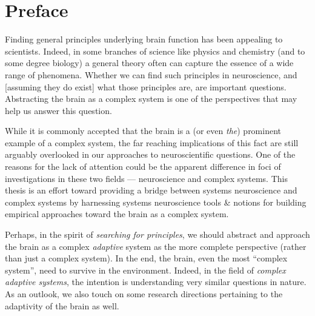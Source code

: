\begingroup
\let\clearpage\relax
\let\cleardoublepage\relax
\let\cleardoublepage\relax

\chapter*{Preface} %

Finding general principles underlying brain function has been appealing to scientists.
Indeed, in some branches of science like physics and chemistry (and to some degree biology) a general theory often can capture the essence of a wide range of phenomena.
Whether we can find such principles in neuroscience, and [assuming they do exist]
what those principles are, are important questions.
Abstracting the brain as a complex system is one of the perspectives that
may help us answer this question.

While it is commonly accepted that the brain is a (or even \emph{the}) prominent example of a complex system, 
the far reaching implications of this fact are still arguably overlooked in our approaches to neuroscientific questions.
% 
One of the reasons for the lack of attention could be the apparent difference in foci of investigations in these two fields --- neuroscience and complex systems.
This thesis is an effort toward providing a bridge between systems neuroscience and complex systems
by harnessing systems neuroscience tools \& notions for building empirical approaches toward the brain as a complex system.


Perhaps, in the spirit of \emph{searching for principles},
we should abstract and approach the brain as a complex \emph{adaptive} system as the more complete perspective (rather than just a complex system).
In the end, the brain, even the most ``complex system'', need to survive in the environment.
Indeed, in the field of \emph{complex adaptive systems}, the intention is understanding very similar questions in nature.
As an outlook, we also touch on some research directions pertaining to the adaptivity of the brain as well.

\endgroup			

\vfill

